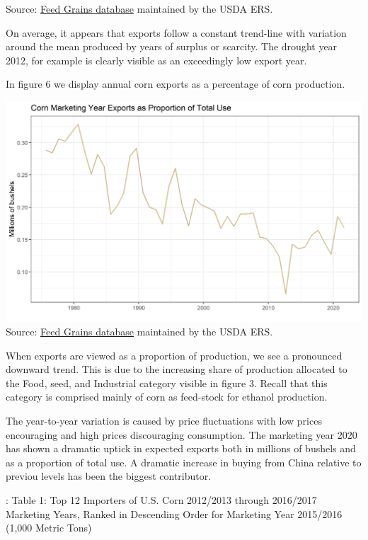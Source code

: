 \documentclass[
]{book}
\begin{document}
Source: \href{http://www.ers.usda.gov/data-products/feed-grains-database/feed-grains-yearbook-tables.aspx\#26780}{Feed Grains
database}
maintained by the USDA ERS.

On average, it appears that exports follow a constant trend-line with
variation around the mean produced by years of surplus or scarcity. The
drought year 2012, for example is clearly visible as an exceedingly low
export year.

In figure 6 we display annual corn exports as a percentage of corn
production.

\includegraphics{assets/ForecastingUseof-CornUseCategoriesExportsPropofUse.png}
Source: \href{http://www.ers.usda.gov/data-products/feed-grains-database/feed-grains-yearbook-tables.aspx\#26780}{Feed Grains
database}
maintained by the USDA ERS.

When exports are viewed as a proportion of production, we see a
pronounced downward trend. This is due to the increasing share of
production allocated to the Food, seed, and Industrial category visible
in figure 3. Recall that this category is comprised mainly of corn as
feed-stock for ethanol production.

The year-to-year variation is caused by price fluctuations with low
prices encouraging and high prices discouraging consumption. The
marketing year 2020 has shown a dramatic uptick in expected exports both
in millions of bushels and as a proportion of total use. A dramatic
increase in buying from China relative to previou levels has been the
biggest contributor.

: Table 1: Top 12 Importers of U.S. Corn 2012/2013 through 2016/2017
Marketing Years, Ranked in Descending Order for Marketing Year 2015/2016
(1,000 Metric Tons)
\end{document}
